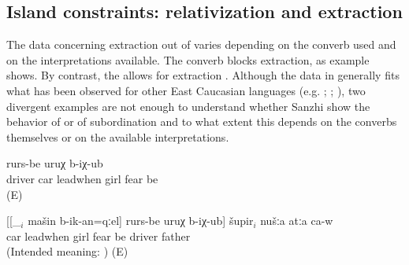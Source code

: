 
\subsection{Island constraints: relativization and extraction}
\label{ssec:Island constraints: relativization and extraction}

The data concerning extraction out of  varies depending on the converb used and on the interpretations available. The converb  blocks extraction, as example  shows. By contrast, the  allows for extraction . Although the data in  generally fits what has been observed for other East Caucasian languages (e.g. \citealp{Kazenin.Testelets2004}; \citealp{Creissels2012}; \citealp{Bickel2010}), two divergent examples are not enough to understand whether Sanzhi  show the behavior of  or of subordination and to what extent this depends on the converbs themselves or on the available interpretations.
%
\begin{exe}
	\ex	\label{ex:father was guiding the car}
	\begin{xlist}

	\ex	\label{ex:When father was guiding the car, the girls became afraid}
	\gll	[šupir-ri mašin	b-ik-an=qːel]	rurs-be	uruχ	b-iχ-ub	\\
		driver	car	leadwhen	girl	fear	be\\
	\glt	{} (E)

	\ex	\label{ex:The driver who when driving the car the girls got afraid is our father}
	\gll	{*}	[[\_$_{i}$ mašin	b-ik-an=qːel]	rurs-be	uruχ	b-iχ-ub]	šupir$_{i}$	nušːa	atːa	ca-w\\
		{}	 car	leadwhen	girl	fear	be	driver		father	\\
	\glt	(Intended meaning: ) (E)
	\end{xlist}
\end{exe}

